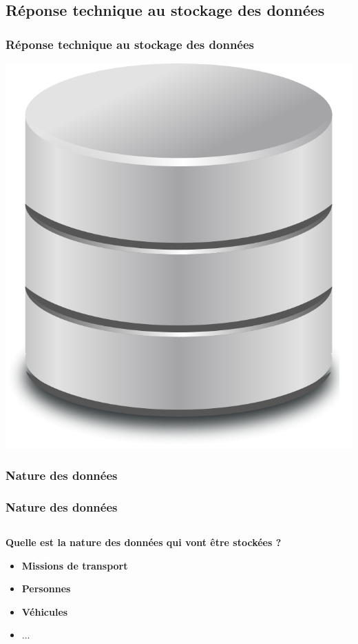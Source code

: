 \subsection{Réponse technique au stockage des données}
\begin{frame}
	\frametitle{Réponse technique au stockage des données}
	\begin{center}
	 \includegraphics[scale=0.18]{Images/Db}
	\end{center}
\end{frame}

\subsubsection[Nature des données]{Nature des données}
\begin{frame}
\frametitle{Nature des données}
\begin{columns}[c]
\begin{column}{12cm}
\begin{block}{\textbf{Quelle est la nature des données qui vont être stockées ?}}
\begin{itemize}
\item \textbf{Missions de transport}
\item \textbf{Personnes}
\item \textbf{Véhicules}
\item ...
\end{itemize}
\end{block}
\end{column}
\end{columns}
\end{frame}

